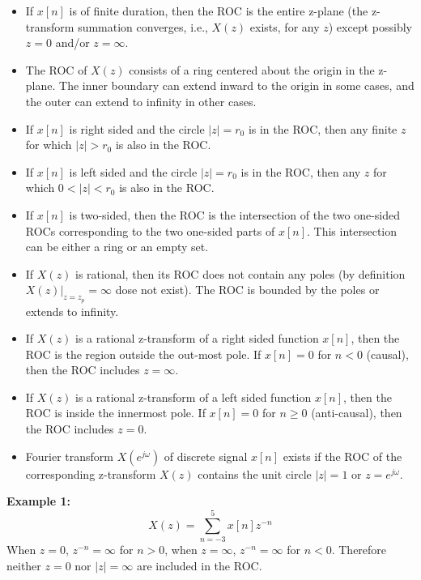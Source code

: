 \begin{itemize}

\item If $x[n]$ is of finite duration, then the ROC is the entire z-plane (the
	z-transform summation converges, i.e., $X(z)$ exists, for any $z$) except
	possibly $z=0$ and/or $z=\infty$.

\item The ROC of $X(z)$ consists of a ring centered about the origin in the z-plane.
	The inner boundary can extend inward to the origin in some cases, and the 
	outer can extend to infinity in other cases.

\item If $x[n]$ is right sided and the circle $|z|=r_0$ is in the ROC, then any 
	finite $z$ for which $|z|>r_0$ is also in the ROC. 

\item If $x[n]$ is left sided and the circle $|z|=r_0$ is in the ROC, then any
	$z$ for which $0<|z|<r_0$ is also in the ROC.

\item If $x[n]$ is two-sided, then the ROC is the intersection of the two one-sided 
	ROCs corresponding to the two one-sided parts of $x[n]$. This intersection
	can be either a ring or an empty set.

\item If $X(z)$ is rational, then its ROC does not contain any poles (by definition 
	$X(z)\bigg|_{z=z_p}=\infty$ dose not exist). The ROC is bounded by the poles or 
	extends to infinity.

\item If $X(z)$ is a rational z-transform of a right sided function $x[n]$, then
	the ROC is the region outside the out-most pole. If $x[n]=0$ for $n<0$
	(causal), then the ROC includes $z=\infty$. 

\item If $X(z)$ is a rational z-transform of a left sided function $x[n]$, then 
	the ROC is inside the innermost pole. If $x[n]=0$ for $n \ge 0$ 
	(anti-causal), then the ROC includes $z=0$. 

\item Fourier transform $X(e^{j\omega})$ of discrete signal $x[n]$ exists if the
	ROC of the corresponding z-transform $X(z)$ contains the unit circle
	$|z|=1$ or $z=e^{j\omega}$.

\end{itemize}

\newpage
{\bf Example 1: } 
\[	X(z)=\sum_{n=-3}^5 x[n]z^{-n}	\]
	When $z=0$, $z^{-n}=\infty$ for $n>0$, when $z=\infty$, $z^{-n}=\infty$
	for $n<0$. Therefore neither $z=0$ nor $|z|=\infty$ are included in the ROC.


